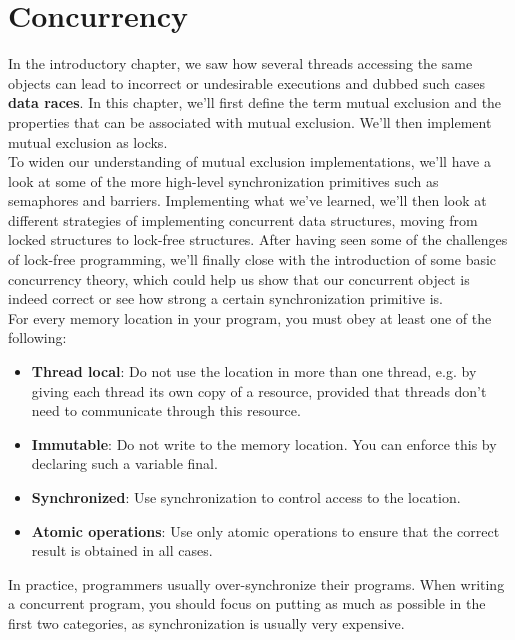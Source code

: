 \documentclass[main]{subfiles}
\begin{document}
\section{Concurrency}
In the introductory chapter, we saw how several threads accessing the same objects can lead to incorrect or undesirable executions and dubbed such cases \textbf{data races}. In this chapter, we'll first define the term mutual exclusion and the properties that can be associated with mutual exclusion. We'll then implement mutual exclusion as locks.\\
To widen our understanding of mutual exclusion implementations, we'll have a look at some of the more high-level synchronization primitives such as semaphores and barriers. Implementing what we've learned, we'll then look at different strategies of implementing concurrent data structures, moving from locked structures to lock-free structures. After having seen some of the challenges of lock-free programming, we'll finally close with the introduction of some basic concurrency theory, which could help us show that our concurrent object is indeed correct or see how strong a certain synchronization primitive is.\\[3mm]
For every memory location in your program, you must obey at least one of the following:
\begin{itemize}
    \item \textbf{Thread local}: Do not use the location in more than one thread, e.g. by giving each thread its own copy of a resource, provided that threads don't need to communicate through this resource.
    \item \textbf{Immutable}: Do not write to the memory location. You can enforce this by declaring such a variable final.
    \item \textbf{Synchronized}: Use synchronization to control access to the location.
    \item \textbf{Atomic operations}: Use only atomic operations to ensure that the correct result is obtained in all cases.
\end{itemize}
In practice, programmers usually over-synchronize their programs. When writing a concurrent program, you should focus on putting as much as possible in the first two categories, as synchronization is usually very expensive.

\end{document}

